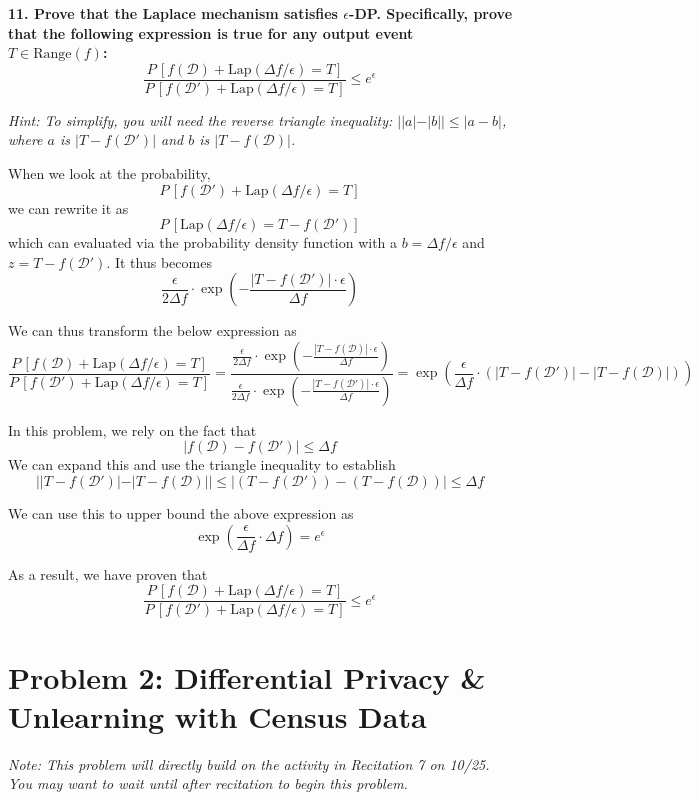 \documentclass{article}
\begin{document}
\textbf{11. Prove that the Laplace mechanism satisfies $\epsilon$-DP. Specifically, prove that the following expression is true for any output event $T \in \text{Range}(f)$:} $$\frac{P\,[f(\mathcal{D}) + \text{Lap}(\Delta f / \epsilon) = T ]}{P\,[f(\mathcal{D'}) + \text{Lap}(\Delta f / \epsilon)= T]} \leq e^\epsilon$$

\textit{Hint: To simplify, you will need the reverse triangle inequality: $| |a| - |b| | \leq |a - b|$, where $a$ is $|T-f(\mathcal{D}')|$ and $b$ is $|T-f(\mathcal{D})|$.}

\bigskip
\begin{mdframed}
When we look at the probability, $$P\,[f(\mathcal{D'}) + \text{Lap}(\Delta f / \epsilon)= T]$$we can rewrite it as $$P\,[\text{Lap}(\Delta f / \epsilon)= T - f(\mathcal{D'})]$$which can evaluated via the probability density function with a $b = \Delta f/\epsilon$ and $z = T - f(\mathcal{D'})$. It thus becomes
$$\frac{\epsilon}{2\Delta f} \cdot \exp \left(-\frac{|T - f(\mathcal{D'})| \cdot \epsilon}{\Delta f}\right)$$

We can thus transform the below expression as 
$$\frac{P\,[f(\mathcal{D}) + \text{Lap}(\Delta f / \epsilon) = T ]}{P\,[f(\mathcal{D'}) + \text{Lap}(\Delta f / \epsilon)= T]} = \frac{\frac{\epsilon}{2\Delta f} \cdot \exp \left(-\frac{|T - f(\mathcal{D})| \cdot \epsilon}{\Delta f}\right)}{\frac{\epsilon}{2\Delta f} \cdot \exp \left(-\frac{|T - f(\mathcal{D'})| \cdot \epsilon}{\Delta f}\right)} = \exp \left(\frac{\epsilon}{\Delta f} \cdot (|T - f(\mathcal{D'})| - |T - f(\mathcal{D})|)  \right)$$

In this problem, we rely on the fact that $$|f(\mathcal{D}) - f(\mathcal{D'})| \leq \Delta f$$
We can expand this and use the triangle inequality to establish $$| |T - f(\mathcal{D'})| - |T-f(\mathcal{D})| | \leq|(T - f(\mathcal{D'})) - (T-f(\mathcal{D}))| \leq \Delta f$$

We can use this to upper bound the above expression as $$\exp \left( \frac{\epsilon}{\Delta f} \cdot \Delta f\right) = e^{\epsilon}$$

As a result, we have proven that 
$$\frac{P\,[f(\mathcal{D}) + \text{Lap}(\Delta f / \epsilon) = T ]}{P\,[f(\mathcal{D'}) + \text{Lap}(\Delta f / \epsilon)= T]} \leq e^\epsilon$$
\end{mdframed}
\bigskip


\clearpage
\section*{Problem 2: Differential Privacy \& Unlearning with Census Data}
\textit{Note: This problem will directly build on the activity in Recitation 7 on 10/25. You may want to wait until after recitation to begin this problem.}
\end{document}
